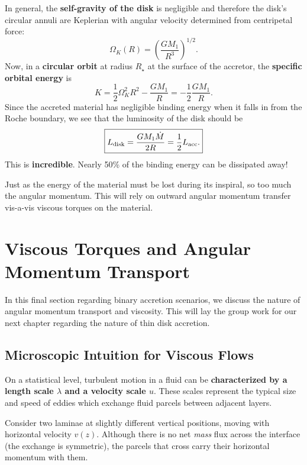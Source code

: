 \par
In general, the \textbf{self-gravity of the disk} is negligible and therefore the disk's circular annuli are Keplerian with angular velocity determined from centripetal force:
\[
\Omega_K(R) = \left(\frac{GM_1}{R^3}\right)^{1/2}.
\]
Now, in a \textbf{circular orbit} at radius $R_\star$ at the surface of the accretor, the \textbf{specific orbital energy} is
\[
K = \frac{1}{2}\Omega_K^2R^2 - \frac{GM_1}{R} = -\frac{1}{2} \frac{GM_1}{R}.
\]
Since the accreted material has negligible binding energy when it falls in from the Roche boundary, we see that the luminosity of the disk should be
\begin{equation}
    \boxed{
    L_{\rm disk} = \frac{GM_1\dot{M}}{2R} = \frac{1}{2}L_{\rm acc}.
    }
\end{equation}
This is \textbf{incredible}. Nearly 50\% of the binding energy can be dissipated away!
\par
Just as the energy of the material must be lost during its inspiral, so too much the angular momentum. This will rely on outward angular momentum transfer vis-a-vis viscous torques on the material.

\section{Viscous Torques and Angular Momentum Transport}

In this final section regarding binary accretion scenarios, we discuss the nature of angular momentum transport and viscosity. This will lay the group work for our next chapter regarding the nature of thin disk accretion.

\subsection{Microscopic Intuition for Viscous Flows}

On a statistical level, turbulent motion in a fluid can be \textbf{characterized by a length scale $\lambda$ and a velocity scale $u$}.  These scales represent the typical size and speed of eddies which exchange fluid parcels between adjacent layers.

Consider two laminae at slightly different vertical positions, moving with horizontal velocity $v(z)$. 
Although there is no net \emph{mass} flux across the interface (the exchange is symmetric), 
the parcels that cross carry their horizontal momentum with them.  

